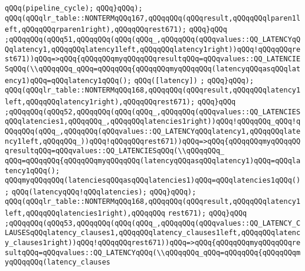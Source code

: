 \verb|qQQq(pipeline_cycle);|\newline
\verb|qQQq}qQQq);|\newline
\verb|qQQq(qQQqlr_table::NONTERMqQQq167,qQQqqQQq(qQQqresult,qQQqqQQqlparen1left,qQQqqQQqrparen1right),qQQqqQQqrest671);|\newline
\verb|qQQq}qQQq|\newline
\verb|;qQQqqQQq(qQQq51,qQQqqQQq(qQQq(qQQq_,qQQqqQQq(qQQqvalues::QQ_LATENCYqQQqlatency1,qQQqqQQqlatency1left,qQQqqQQqlatency1right))qQQq!qQQqqQQqrest671))qQQq=>qQQq{qQQqqQQqmyqQQqqQQqresultqQQq=qQQqvalues::QQ_LATENCIESqQQq(\\qQQqqQQq_qQQq=qQQqqQQq{qQQqqQQqmyqQQqqQQq(latencyqQQqasqQQqlatency1)qQQq=qQQqlatency1qQQq();|\newline
\verb|qQQq([latency])|\newline
\verb|;|\newline
\verb|qQQq}qQQq);|\newline
\verb|qQQq(qQQqlr_table::NONTERMqQQq168,qQQqqQQq(qQQqresult,qQQqqQQqlatency1left,qQQqqQQqlatency1right),qQQqqQQqrest671);|\newline
\verb|qQQq}qQQq|\newline
\verb|;qQQqqQQq(qQQq52,qQQqqQQq(qQQq(qQQq_,qQQqqQQq(qQQqvalues::QQ_LATENCIESqQQqlatencies1,qQQqqQQq_,qQQqqQQqlatencies1right))qQQq!qQQqqQQq_qQQq!qQQqqQQq(qQQq_,qQQqqQQq(qQQqvalues::QQ_LATENCYqQQqlatency1,qQQqqQQqlatency1left,qQQqqQQq_))qQQq!qQQqqQQqrest671))qQQq=>qQQq{qQQqqQQqmyqQQqqQQqresultqQQq=qQQqvalues::QQ_LATENCIESqQQq(\\qQQqqQQq_|\newline
\verb|qQQq=qQQqqQQq{qQQqqQQqmyqQQqqQQq(latencyqQQqasqQQqlatency1)qQQq=qQQqlatency1qQQq();|\newline
\verb|qQQqmyqQQqqQQq(latenciesqQQqasqQQqlatencies1)qQQq=qQQqlatencies1qQQq();|\newline
\verb|qQQq(latencyqQQq!qQQqlatencies);|\newline
\verb|qQQq}qQQq);|\newline
\verb|qQQq(qQQqlr_table::NONTERMqQQq168,qQQqqQQq(qQQqresult,qQQqqQQqlatency1left,qQQqqQQqlatencies1right),qQQqqQQq|\newline
\verb|rest671);|\newline
\verb|qQQq}qQQq|\newline
\verb|;qQQqqQQq(qQQq53,qQQqqQQq(qQQq(qQQq_,qQQqqQQq(qQQqvalues::QQ_LATENCY_CLAUSESqQQqlatency_clauses1,qQQqqQQqlatency_clauses1left,qQQqqQQqlatency_clauses1right))qQQq!qQQqqQQqrest671))qQQq=>qQQq{qQQqqQQqmyqQQqqQQqresultqQQq=qQQqvalues::QQ_LATENCYqQQq(\\qQQqqQQq_qQQq=qQQqqQQq{qQQqqQQqmyqQQqqQQq(latency_clauses|\newline
